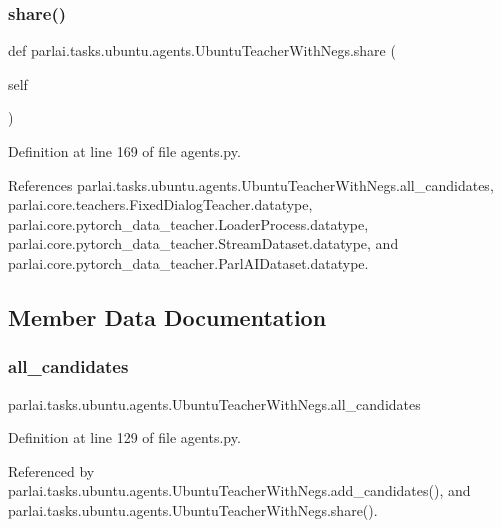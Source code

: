 \subsubsection{\texorpdfstring{share()}{share()}}
{\footnotesize\ttfamily def parlai.\+tasks.\+ubuntu.\+agents.\+Ubuntu\+Teacher\+With\+Negs.\+share (\begin{DoxyParamCaption}\item[{}]{self }\end{DoxyParamCaption})}



Definition at line 169 of file agents.\+py.



References parlai.\+tasks.\+ubuntu.\+agents.\+Ubuntu\+Teacher\+With\+Negs.\+all\+\_\+candidates, parlai.\+core.\+teachers.\+Fixed\+Dialog\+Teacher.\+datatype, parlai.\+core.\+pytorch\+\_\+data\+\_\+teacher.\+Loader\+Process.\+datatype, parlai.\+core.\+pytorch\+\_\+data\+\_\+teacher.\+Stream\+Dataset.\+datatype, and parlai.\+core.\+pytorch\+\_\+data\+\_\+teacher.\+Parl\+A\+I\+Dataset.\+datatype.



\subsection{Member Data Documentation}
\mbox{\label{classparlai_1_1tasks_1_1ubuntu_1_1agents_1_1UbuntuTeacherWithNegs_ab4625f39fc5003fb1ea94be95c8e8ef9}} 
\subsubsection{\texorpdfstring{all\+\_\+candidates}{all\_candidates}}
{\footnotesize\ttfamily parlai.\+tasks.\+ubuntu.\+agents.\+Ubuntu\+Teacher\+With\+Negs.\+all\+\_\+candidates}



Definition at line 129 of file agents.\+py.



Referenced by parlai.\+tasks.\+ubuntu.\+agents.\+Ubuntu\+Teacher\+With\+Negs.\+add\+\_\+candidates(), and parlai.\+tasks.\+ubuntu.\+agents.\+Ubuntu\+Teacher\+With\+Negs.\+share().

